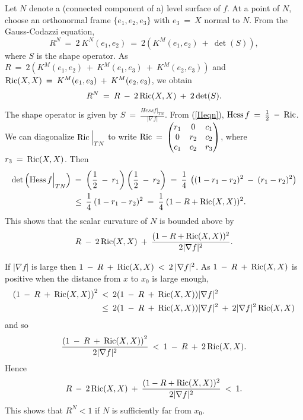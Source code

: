 Let $N$ denote a (connected component of a)
level surface of $f$. At a point of $N$,
choose an orthonormal frame
$\{e_1, e_2, e_3\}$ with $e_3 \: = \: X$ normal to $N$.
From the Gauss-Codazzi equation,
\begin{equation}
R^N \: = \: 2 \: K^N(e_1, e_2)
\: = \: 2 (K^M(e_1, e_2) \: + \: \det(S)),
\end{equation}
where $S$ is the shape operator. As
$R \: = \: 2 (K^M(e_1, e_2) \: + \: K^M(e_1, e_3) \: + \:
K^M(e_2, e_3))$ and
$\operatorname{Ric}(X, X) \: = \: K^M(e_1, e_3) \: + \:
K^M(e_2, e_3)$, we obtain
\begin{equation}
R^N \: = \: R \: - \: 2 \operatorname{Ric}(X, X) \: + \: 2 \det(S).
\end{equation}
The shape operator is given by
$S \: = \: \frac{Hess f |_{TN}}{|\nabla f|}$.
From (\ref{IIeqn}),
$\operatorname{Hess} f \: = \: \frac{1}{2} \: - \: \operatorname{Ric}$. We can
diagonalize $\operatorname{Ric} \Big|_{TN}$ to write
$\operatorname{Ric} \: = \:
\begin{pmatrix}
r_1 & 0 & c_1 \\
0 & r_2 & c_2 \\
c_1 & c_2 & r_3
\end{pmatrix}$, where $r_3 \: = \: \operatorname{Ric}(X, X)$. Then
\begin{align}
\det \left( \operatorname{Hess} f \Big|_{TN} \right) \: & = \:
\left( \frac{1}{2} \: - \: r_1 \right) \left( \frac{1}{2} \: - \: r_2 \right)
\: = \:
\frac{1}{4} \: \left( (1 - r_1 - r_2)^2 \: - \: (r_1 - r_2)^2 \right)
\\
& \le \: \frac{1}{4} \: (1 - r_1 - r_2)^2
\:  = \:
\frac{1}{4} \: (1 - R + \operatorname{Ric}(X, X))^2. \notag
\end{align}
This shows that the scalar curvature of $N$ is bounded above by
\begin{equation}
R \: - \: 2 \operatorname{Ric}(X, X) \: + \: \frac{(1-R+\operatorname{Ric}(X, X))^2}{2|\nabla f|^2}.
\end{equation}

If $|\nabla f|$ is large then
$1 \: - \: R \: + \: \operatorname{Ric}(X, X) \: < \: 2 \: |\nabla f|^2$.
As $1 \: - \: R \: + \: \operatorname{Ric}(X, X)$ is positive when the
distance from $x$ to $x_0$ is large enough,
\begin{align}
\left( 1 \: - \: R \: + \: \operatorname{Ric}(X, X) \right)^2 \: & < \:
2 (1 \: - \: R \: + \: \operatorname{Ric}(X, X)) |\nabla f|^2 \\
& \le \:
2 (1 \: - \: R \: + \: \operatorname{Ric}(X, X)) |\nabla f|^2 \: + \:
2 |\nabla f|^2 \operatorname{Ric}(X, X) \notag
\end{align}
and so
\begin{equation}
\frac{\left( 1 \: - \: R \: + \: \operatorname{Ric}(X, X) \right)^2}{2|\nabla f|^2}
 \: < \:
1 \: - \: R \: + \: 2 \operatorname{Ric}(X, X).
\end{equation}
Hence
\begin{equation}
R \: - \: 2 \operatorname{Ric}(X, X) \: + \: \frac{(1-R+\operatorname{Ric}(X, X))^2}{2|\nabla f|^2}
\: < \: 1.
\end{equation}
This shows that $R^N < 1$ if $N$ is sufficiently far from $x_0$.


